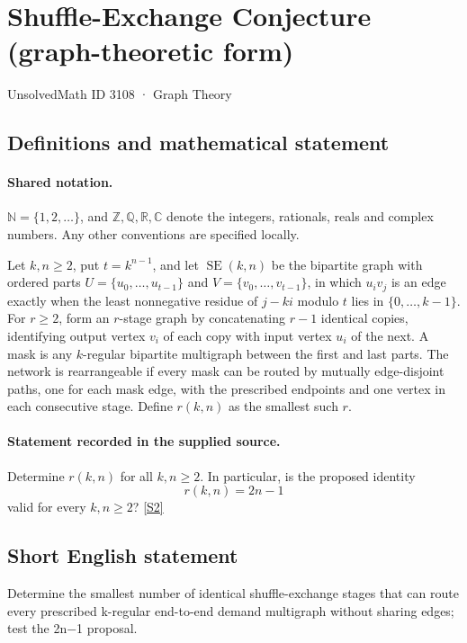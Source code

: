 \documentclass[11pt]{book}
\newcommand{\sref}[2]{\hyperlink{source:#1:#2}{[S#2]}}
\begin{document}
\setcounter{section}{3107}
\section{Shuffle-Exchange Conjecture (graph-theoretic form)}\label{3108}
{\small\sffamily UnsolvedMath ID 3108 · Graph Theory}
\subsection{Definitions and mathematical statement}

\paragraph{Shared notation.}$\mathbb N=\{1,2,\ldots\}$, and $\mathbb Z,\mathbb Q,\mathbb R,\mathbb C$ denote the integers, rationals, reals and complex numbers. Any other conventions are specified locally.


Let $k,n\geq2$, put $t=k^{n-1}$, and let $\operatorname{SE}(k,n)$ be the bipartite graph with ordered parts $U=\{u_0,\ldots,u_{t-1}\}$ and $V=\{v_0,\ldots,v_{t-1}\}$, in which $u_iv_j$ is an edge exactly when the least nonnegative residue of $j-ki$ modulo $t$ lies in $\{0,\ldots,k-1\}$. For $r\geq2$, form an $r$-stage graph by concatenating $r-1$ identical copies, identifying output vertex $v_i$ of each copy with input vertex $u_i$ of the next. A mask is any $k$-regular bipartite multigraph between the first and last parts. The network is rearrangeable if every mask can be routed by mutually edge-disjoint paths, one for each mask edge, with the prescribed endpoints and one vertex in each consecutive stage. Define $r(k,n)$ as the smallest such $r$.
\paragraph{Statement recorded in the supplied source.}
Determine $r(k,n)$ for all $k,n\geq2$. In particular, is the proposed identity
\[r(k,n)=2n-1\]
valid for every $k,n\geq2$? \sref{3108}{2}
\subsection{Short English statement}
Determine the smallest number of identical shuffle-exchange stages that can route every prescribed k-regular end-to-end demand multigraph without sharing edges; test the 2n−1 proposal.
\end{document}
